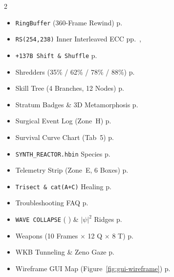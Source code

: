 \documentclass[10pt,letterpaper]{article}
\newcommand{\kbd}[1]{%
  \tikz[baseline=(char.base)]{%
    \node[draw=plnSlate!60, fill=plnSoft, rounded corners=2pt, inner xsep=3.2pt, inner ysep=1.2pt, font=\scriptsize\ttfamily\bfseries] (char) {#1};%
  }%
}
\begin{document}
\begin{multicols}{2}
\begin{itemize}[leftmargin=1.1em, itemsep=1.2pt, parsep=0pt]
  \item \texttt{RingBuffer} (360-Frame Rewind) \dotfill p.~\pageref{sec:quantum-temporal}
  \item \texttt{RS(254,238)} Inner Interleaved ECC \dotfill pp.~\pageref{sec:tab3}, \pageref{sec:dock}
  \item \texttt{+137B Shift \& Shuffle} \dotfill p.~\pageref{sec:dock}
  \item Shredders (35\% / 62\% / 78\% / 88\%) \dotfill p.~\pageref{sec:dock}
  \item Skill Tree (4 Branches, 12 Nodes) \dotfill p.~\pageref{sec:tab1}
  \item Stratum Badges \& 3D Metamorphosis \dotfill p.~\pageref{sec:zone-b}
  \item Surgical Event Log (Zone~H) \dotfill p.~\pageref{sec:dock}
  \item Survival Curve Chart (Tab~5) \dotfill p.~\pageref{sec:tab5}
  \item \texttt{SYNTH\_REACTOR.hbin} Species \dotfill p.~\pageref{sec:species}
  \item Telemetry Strip (Zone~E, 6 Boxes) \dotfill p.~\pageref{sec:workbench}
  \item \texttt{Trisect \& cat(A+C)} Healing \dotfill p.~\pageref{sec:dock}
  \item Troubleshooting FAQ \dotfill p.~\pageref{sec:conclusions}
  \item \texttt{WAVE COLLAPSE} (\kbd{V}) \& $|\psi|^2$ Ridges \dotfill p.~\pageref{sec:quantum-temporal}
  \item Weapons (10 Frames $\times$ 12 Q $\times$ 8 T) \dotfill p.~\pageref{sec:tab1}
  \item WKB Tunneling \& Zeno Gaze \dotfill p.~\pageref{sec:quantum-temporal}
  \item Wireframe GUI Map (Figure~\ref{fig:gui-wireframe}) \dotfill p.~\pageref{sec:gui-anatomy}
\end{itemize}
\end{multicols}
\end{document}
